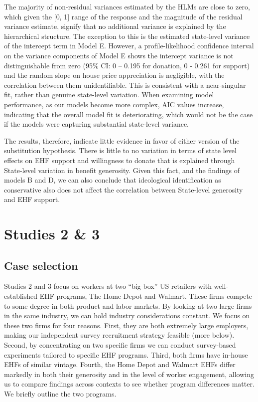 \documentclass[
  11pt,
  oneside]{article}
\begin{document}
The majority of non-residual variances estimated by the HLMs are close to zero, which given the {[}0, 1{]} range of the response and the magnitude of the residual variance estimate, signify that no additional variance is explained by the hierarchical structure. The exception to this is the estimated state-level variance of the intercept term in Model E. However, a profile-likelihood confidence interval on the variance components of Model E shows the intercept variance is not distinguishable from zero (95\% CI: 0 -- 0.195 for donation, 0 - 0.261 for support) and the random slope on house price appreciation is negligible, with the correlation between them unidentifiable. This is consistent with a near-singular fit, rather than genuine state-level variation. When examining model performance, as our models become more complex, AIC values increase, indicating that the overall model fit is deteriorating, which would not be the case if the models were capturing substantial state-level variance.

The results, therefore, indicate little evidence in favor of either version of the substitution hypothesis. There is little to no variation in terms of state level effects on EHF support and willingness to donate that is explained through State-level variation in benefit generosity. Given this fact, and the findings of models B and D, we can also conclude that ideological identification as conservative also does not affect the correlation between State-level generosity and EHF support.

\section{Studies 2 \& 3}\label{sec-study2-3}

\subsection{Case selection}\label{case-selection}

Studies 2 and 3 focus on workers at two ``big box'' US retailers with well-established EHF programs, The Home Depot and Walmart. These firms compete to some degree in both product and labor markets. By looking at two large firms in the same industry, we can hold industry considerations constant. We focus on these two firms for four reasons. First, they are both extremely large employers, making our independent survey recruitment strategy feasible (more below). Second, by concentrating on two specific firms we can conduct survey-based experiments tailored to specific EHF programs. Third, both firms have in-house EHFs of similar vintage. Fourth, the Home Depot and Walmart EHFs differ markedly in both their generosity and in the level of worker engagement, allowing us to compare findings across contexts to see whether program differences matter. We briefly outline the two programs.
\end{document}
